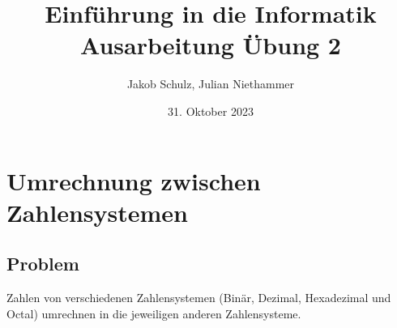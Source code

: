 \documentclass[a4paper,11pt,titlepage]{article}
\begin{document}
\title{Einf\"uhrung in die Informatik\\
Ausarbeitung \"Ubung 2}


\author{Jakob Schulz, Julian Niethammer}


\date{31. Oktober 2023}

\maketitle{\thispagestyle{plain}}

\section{Umrechnung zwischen Zahlensystemen}

\subsection{Problem}
Zahlen von verschiedenen Zahlensystemen (Binär, Dezimal, Hexadezimal und Octal) umrechnen in die jeweiligen anderen Zahlensysteme.
\end{document}
